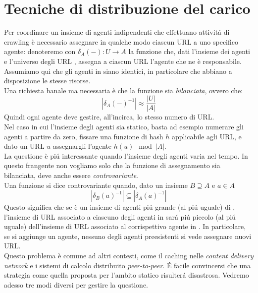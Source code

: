 \section{Tecniche di distribuzione del carico}
Per coordinare un insieme  di agenti indipendenti che effettuano attivitá di crawling è necessario assegnare in qualche modo ciascun URL a uno specifico agente: denoteremo con $\delta_A(-): U \rightarrow A$ la funzione che, dati l'insieme dei agenti  e l'universo degli URL , assegna a ciascun URL l'agente che ne è responsabile. Assumiamo qui che gli agenti in  siano identici, in particolare che abbiano a disposizione le stesse risorse.\\
Una richiesta banale ma necessaria è che la funzione sia \textit{bilanciata}, ovvero che:
\begin{equation*}
    |\delta_A(-)^{-1}| \approx \frac{|U|}{|A|}
\end{equation*}
Quindi ogni agente deve gestire, all'incirca, lo stesso numero di URL.\\
Nel caso in cui l'insieme degli agenti sia statico, basta ad esempio numerare gli agenti a partire da zero, fissare una funzione di hash $h$ applicabile agli URL, e dato un URL $u$ assegnargli l'agente $h(u)\mod|A|$.\\
La questione è piú interessante quando l'insieme degli agenti varia nel tempo. In questo frangente non vogliamo solo che la funzione di assegnamento sia bilanciata, deve anche essere \textit{controvariante}.\\
Una funzione si dice controvariante quando, dato un insieme $B \supseteq A$ e $a \in A$
\begin{equation*}
    |\delta_B(a)^{-1}| \subseteq |\delta_A(a)^{-1}|
\end{equation*}
Questo significa che se  è un insieme di agenti piú grande (al piú uguale) di , l'insieme di URL associato a ciascuno degli agenti in  sará piú piccolo (al piú uguale) dell'insieme di URL associato al corrispettivo agente in . In particolare, se si aggiunge un agente, nessuno degli agenti preesistenti si vede assegnare nuovi URL.\\
Questo problema è comune ad altri contesti, come il caching nelle \textit{content delivery network} e i sistemi di calcolo distribuito \textit{peer-to-peer}. É facile convincersi che una strategia come quella proposta per l'ambito statico risulterá disastrosa. Vedremo adesso tre modi diversi per gestire la questione.
